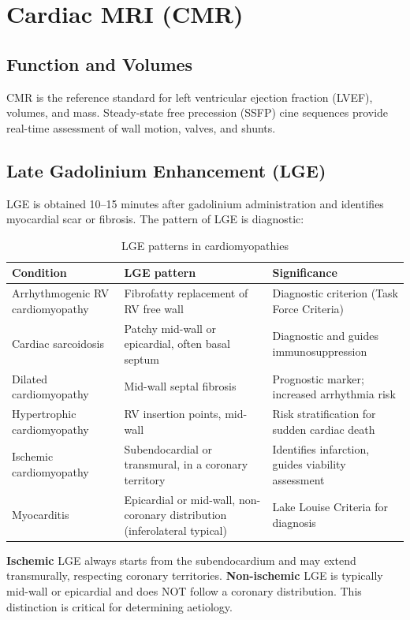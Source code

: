 \section{Cardiac MRI (CMR)}

\subsection{Function and Volumes}
CMR is the reference standard for left ventricular ejection fraction (LVEF), volumes, and mass. Steady-state free precession (SSFP) cine sequences provide real-time assessment of wall motion, valves, and shunts.

\subsection{Late Gadolinium Enhancement (LGE)}
LGE is obtained 10--15 minutes after gadolinium administration and identifies myocardial scar or fibrosis. The pattern of LGE is diagnostic:

\begin{table}[h]
\centering
\caption{LGE patterns in cardiomyopathies}
\begin{tabular}{p{3.5cm} p{5cm} p{4.5cm}}
\hline
\textbf{Condition} & \textbf{LGE pattern} & \textbf{Significance} \\
\hline
Arrhythmogenic RV cardiomyopathy & Fibrofatty replacement of RV free wall & Diagnostic criterion (Task Force Criteria) \\
Cardiac sarcoidosis & Patchy mid-wall or epicardial, often basal septum & Diagnostic and guides immunosuppression \\
Dilated cardiomyopathy & Mid-wall septal fibrosis & Prognostic marker; increased arrhythmia risk \\
Hypertrophic cardiomyopathy & RV insertion points, mid-wall & Risk stratification for sudden cardiac death \\
Ischemic cardiomyopathy & Subendocardial or transmural, in a coronary territory & Identifies infarction, guides viability assessment \\
Myocarditis & Epicardial or mid-wall, non-coronary distribution (inferolateral typical) & Lake Louise Criteria for diagnosis \\
\hline
\end{tabular}
\end{table}

\begin{pearlbox}
\textbf{Ischemic} LGE always starts from the subendocardium and may extend transmurally, respecting coronary territories. \textbf{Non-ischemic} LGE is typically mid-wall or epicardial and does NOT follow a coronary distribution. This distinction is critical for determining aetiology.
\end{pearlbox}

